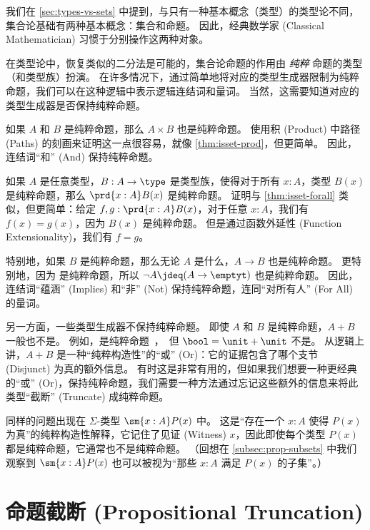 %
我们在 \cref{sec:types-vs-sets} 中提到，与只有一种基本概念（类型）的类型论不同，集合论基础有两种基本概念：集合和命题。
因此，经典数学家 (Classical Mathematician) 习惯于分别操作这两种对象。

在类型论中，恢复类似的二分法是可能的，集合论命题的作用由 \emph{纯粹} 命题的类型（和类型族）扮演。
在许多情况下，通过简单地将对应的类型生成器限制为纯粹命题，我们可以在这种逻辑中表示逻辑连结词和量词。
当然，这需要知道对应的类型生成器是否保持纯粹命题。

\begin{eg}
  如果 $A$ 和 $B$ 是纯粹命题，那么 $A\times B$ 也是纯粹命题。
  使用积 (Product) 中路径 (Paths) 的刻画来证明这一点很容易，就像 \cref{thm:isset-prod}，但更简单。
  因此，连结词“和” (And) 保持纯粹命题。
\end{eg}

\begin{eg}\label{thm:isprop-forall}
如果 $A$ 是任意类型，$B:A\to \type$ 是类型族，使得对于所有 $x:A$，类型 $B(x)$ 是纯粹命题，那么 $\prd{x:A} B(x)$ 是纯粹命题。
证明与 \cref{thm:isset-forall} 类似，但更简单：给定 $f,g:\prd{x:A} B(x)$，对于任意 $x:A$，我们有 $f(x)=g(x)$，因为 $B(x)$ 是纯粹命题。
但是通过函数外延性 (Function Extensionality)，我们有 $f=g$。

特别地，如果 $B$ 是纯粹命题，那么无论 $A$ 是什么，$A\to B$ 也是纯粹命题。
更特别地，因为 \emptyt 是纯粹命题，所以 $\neg A \jdeq (A\to\emptyt)$ 也是纯粹命题。
%
因此，连结词“蕴涵” (Implies) 和“非” (Not) 保持纯粹命题，连同“对所有人” (For All) 的量词。
\end{eg}

另一方面，一些类型生成器不保持纯粹命题。
即使 $A$ 和 $B$ 是纯粹命题，$A+B$ 一般也不是。
例如，\unit 是纯粹命题，但 $\bool=\unit+\unit$ 不是。
从逻辑上讲，$A+B$ 是一种“纯粹构造性”的“或” (Or)：它的证据包含了哪个支节 (Disjunct) 为真的额外信息。
有时这是非常有用的，但如果我们想要一种更经典的“或” (Or)，保持纯粹命题，我们需要一种方法通过忘记这些额外的信息来将此类型“截断” (Truncate) 成纯粹命题。

%
同样的问题出现在 $\Sigma$-类型 $\sm{x:A} P(x)$ 中。
这是“存在一个 $x:A$ 使得 $P(x)$ 为真”的纯粹构造性解释，它记住了见证 (Witness) $x$，因此即使每个类型 $P(x)$ 都是纯粹命题，它通常也不是纯粹命题。
（回想在 \cref{subsec:prop-subsets} 中我们观察到 $\sm{x:A} P(x)$ 也可以被视为“那些 $x:A$ 满足 $P(x)$ 的子集”。）

\section{命题截断 (Propositional Truncation)}
\label{subsec:prop-trunc}

